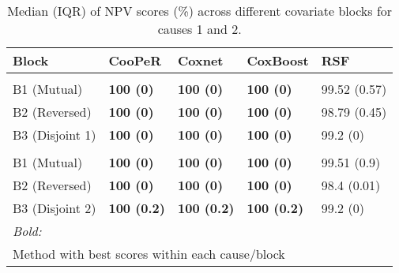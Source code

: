 \begin{table}
\centering
\caption{Median (IQR) of NPV scores (\%) across different covariate blocks for causes 1 and 2.\label{tab:npv-median}}
\centering
\begin{tabular}[t]{lllll}
\toprule
Block & CooPeR & Coxnet & CoxBoost & RSF\\
\midrule
\addlinespace[0.3em]
\multicolumn{5}{l}{\textbf{Cause 1}}\\
\hspace{1em}B1 (Mutual) & \textbf{100 (0)} & \textbf{100 (0)} & \textbf{100 (0)} & 99.52 (0.57)\\
\hspace{1em}B2 (Reversed) & \textbf{100 (0)} & \textbf{100 (0)} & \textbf{100 (0)} & 98.79 (0.45)\\
\hspace{1em}B3 (Disjoint 1) & \textbf{100 (0)} & \textbf{100 (0)} & \textbf{100 (0)} & 99.2 (0)\\
\addlinespace[0.3em]
\multicolumn{5}{l}{\textbf{Cause 2}}\\
\hspace{1em}B1 (Mutual) & \textbf{100 (0)} & \textbf{100 (0)} & \textbf{100 (0)} & 99.51 (0.9)\\
\hspace{1em}B2 (Reversed) & \textbf{100 (0)} & \textbf{100 (0)} & \textbf{100 (0)} & 98.4 (0.01)\\
\hspace{1em}B3 (Disjoint 2) & \textbf{100 (0.2)} & \textbf{100 (0.2)} & \textbf{100 (0.2)} & 99.2 (0)\\
\bottomrule
\multicolumn{5}{l}{\rule{0pt}{1em}\textit{Bold:}}\\
\multicolumn{5}{l}{\rule{0pt}{1em}Method with best scores within each cause/block}\\
\end{tabular}
\end{table}
